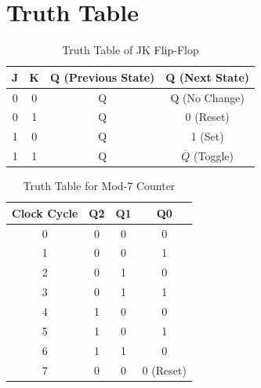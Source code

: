 \documentclass[12pt,a4paper]{article}
\begin{document}
\section{Truth Table}
\begin{table}[H]
    \centering
    \renewcommand{\arraystretch}{1.2}
    \begin{tabular}{|c|c|c|c|}
        \hline
        \textbf{J} & \textbf{K} & \textbf{Q (Previous State)} & \textbf{Q (Next State)} \\
        \hline
        0 & 0 & Q & Q (No Change) \\
        0 & 1 & Q & 0 (Reset) \\
        1 & 0 & Q & 1 (Set) \\
        1 & 1 & Q & $\overline{Q}$ (Toggle) \\
        \hline
    \end{tabular}
    \caption{Truth Table of JK Flip-Flop}
    \label{tab:jk_flipflop}
\end{table}

\begin{table}[H]
    \centering
    \begin{tabular}{|c|c|c|c|}
        \hline
        Clock Cycle & Q2 & Q1 & Q0 \\
        \hline
        0 & 0 & 0 & 0 \\
        1 & 0 & 0 & 1 \\
        2 & 0 & 1 & 0 \\
        3 & 0 & 1 & 1 \\
        4 & 1 & 0 & 0 \\
        5 & 1 & 0 & 1 \\
        6 & 1 & 1 & 0 \\
        7 & 0 & 0 & 0 (Reset) \\
        \hline
    \end{tabular}
    \caption{Truth Table for Mod-7 Counter}
    \label{tab:truth_table}
\end{table}
\end{document}
